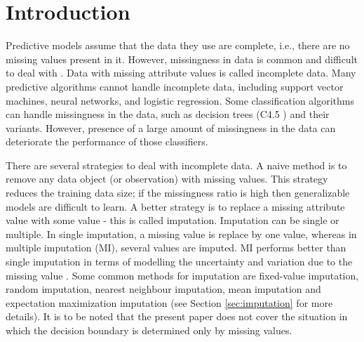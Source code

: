\documentclass{iosart2c}
\begin{document}
\section{Introduction}

Predictive models assume that the data they use are complete, i.e., there are no missing values present in it. However, missingness in data is common and difficult to deal with \cite{HuangData2016, Donders2006Review,conroy2016dynamic}. Data with missing attribute values is called incomplete data. Many predictive algorithms cannot handle incomplete data, including support vector machines, neural networks, and logistic regression. Some classification algorithms can handle missingness in the data, such as decision trees (C4.5 \cite{quinlan2014c4}) and their variants. However, presence of a large amount of missingness in the data can deteriorate the performance of those classifiers.

There are several strategies to deal with incomplete data. A naive method is to remove any data object (or observation) with missing values. This strategy reduces the training data size; if the missingness ratio is high then generalizable models are difficult to learn. A better strategy is to replace a missing attribute value with some value - this is called imputation. Imputation can be single or multiple. In single imputation, a missing value is replace by one value, whereas in multiple imputation (MI), several values are imputed. MI performs better than single imputation in terms of modelling the uncertainty and variation due to the missing value \cite{rezvan2015rise}. Some common methods for imputation are fixed-value imputation, random imputation, nearest neighbour imputation, mean imputation \cite{gelman2006data,schmitt2015comparison} and expectation maximization imputation \cite{Lin2010} (see Section \ref{sec:imputation} for more details). It is to be noted that the present paper does not cover the situation in which the decision boundary is determined only by missing values.
\end{document}
